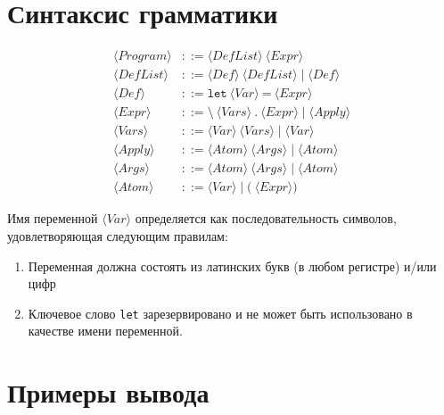 \documentclass{article}
\begin{document}
\section{Синтаксис грамматики}

\begin{align*}
    \langle Program \rangle &::= \langle DefList \rangle \ \langle Expr \rangle \\
    \langle DefList \rangle &::= \langle Def \rangle \ \langle DefList \rangle \mid \langle Def \rangle \\
    \langle Def \rangle     &::= \texttt{let} \ \langle Var \rangle \ \texttt{=} \ \langle Expr \rangle \\
    \langle Expr \rangle    &::= \texttt{\textbackslash} \ \langle Vars \rangle \ \texttt{.} \ \langle Expr \rangle \mid \langle Apply \rangle \\
    \langle Vars \rangle    &::= \langle Var \rangle \ \langle Vars \rangle \mid \langle Var \rangle \\
    \langle Apply \rangle   &::= \langle Atom \rangle \ \langle Args \rangle \mid \langle Atom \rangle \\
    \langle Args \rangle    &::= \langle Atom \rangle \ \langle Args \rangle \mid \langle Atom \rangle \\
    \langle Atom \rangle    &::= \langle Var \rangle \mid \texttt{(} \ \langle Expr \rangle \texttt{)}
\end{align*}


Имя переменной $\langle Var \rangle$ определяется как последовательность символов, удовлетворяющая следующим правилам:
\begin{enumerate}
    \item Переменная должна состоять из латинских букв (в любом регистре) и/или цифр
    \item Ключевое слово \texttt{let} зарезервировано и не может быть использовано в качестве имени переменной.
\end{enumerate}

\section{Примеры вывода}
\end{document}
